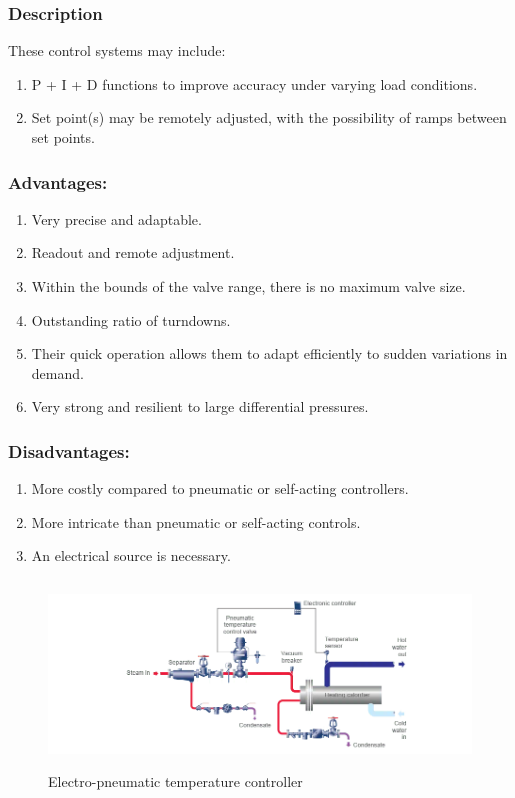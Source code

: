 \subsubsection{Description}

These control systems may include:

\begin{enumerate}
\item
  P + I + D functions to improve accuracy under varying load conditions.
\item
  Set point(s) may be remotely adjusted, with the possibility of ramps
  between set points.
\end{enumerate}

\subsubsection{Advantages:}

\begin{enumerate}
\item
  Very precise and adaptable.
\item
  Readout and remote adjustment.
\item
  Within the bounds of the valve range, there is no maximum valve size.
\item
  Outstanding ratio of turndowns.
\item
  Their quick operation allows them to adapt efficiently to sudden
  variations in demand.
\item
  Very strong and resilient to large differential pressures.
\end{enumerate}

\subsubsection{Disadvantages:}

\begin{enumerate}
\item
  More costly compared to pneumatic or self-acting controllers.
\item
  More intricate than pneumatic or self-acting controls.
\item
An electrical source is necessary.
\end{enumerate}

\begin{figure}[h!]
  \centering
  \includegraphics[width=5.88235in,height=1.95588in]{figs/control_instrumentation/image4.png}
  \caption{Electro-pneumatic temperature controller}
  \label{fig:Electro-pneumatic temperature controller}
\end{figure}



